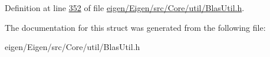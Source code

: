 Definition at line \hyperlink{eigen_2_eigen_2src_2_core_2util_2_blas_util_8h_source_l00352}{352} of file \hyperlink{eigen_2_eigen_2src_2_core_2util_2_blas_util_8h_source}{eigen/\+Eigen/src/\+Core/util/\+Blas\+Util.\+h}.



The documentation for this struct was generated from the following file\+:\begin{DoxyCompactItemize}
\item 
eigen/\+Eigen/src/\+Core/util/\+Blas\+Util.\+h\end{DoxyCompactItemize}

